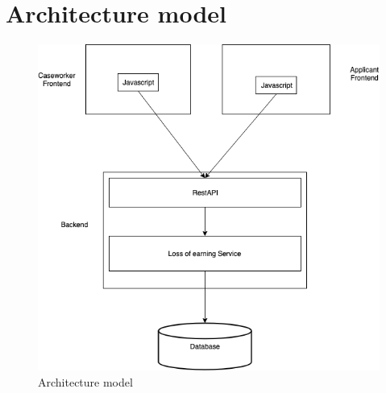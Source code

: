 \newpage
\section{Architecture model}
\begin{figure}[htb!]
    \centering
    \includegraphics[width=\textwidth]{img/architecture-model.png}
    \caption{Architecture model}
\end{figure}
